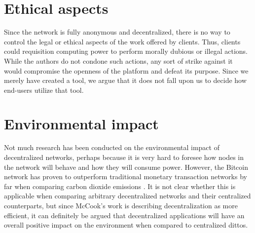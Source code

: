 \section{Ethical aspects}
Since the network is fully anonymous and decentralized, there is no way to control the legal or ethical aspects of the work offered by clients. Thus, clients could requisition computing power to perform morally dubious or illegal actions. While the authors do not condone such actions, any sort of strike against it would compromise the openness of the platform and defeat its purpose. Since we merely have created a tool, we argue that it does not fall upon us to decide how end-users utilize that tool.

\section{Environmental impact}
Not much research has been conducted on the environmental impact of decentralized networks, perhaps because it is very hard to foresee how nodes in the network will behave and how they will consume power. However, the Bitcoin network has proven to outperform traditional monetary transaction networks by far when comparing carbon dioxide emissions \cite{cook}. It is not clear whether this is applicable when comparing arbitrary decentralized networks and their centralized counterparts, but since McCook's work is describing decentralization as more efficient, it can definitely be argued that decentralized applications will have an overall positive impact on the environment when compared to centralized dittos.
